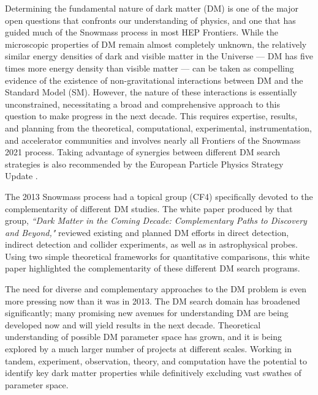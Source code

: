 \documentclass[nofootinbib]{article}
\begin{document}
Determining the fundamental nature of dark matter (DM) is one of the major open questions that confronts our understanding of physics, and one that has guided much of the Snowmass process in most HEP Frontiers. 
While the microscopic properties of DM remain almost completely unknown, the relatively similar energy densities of dark and visible matter in the Universe --- DM has five times more energy density than visible matter --- can be taken as compelling evidence of the existence of non-gravitational interactions between DM and the Standard Model (SM). However, the nature of these interactions is essentially unconstrained, necessitating a broad and comprehensive approach to this question to make progress in the next decade. 
This requires expertise, results, and planning from the theoretical, computational, experimental, instrumentation, and accelerator communities and involves nearly all Frontiers of the Snowmass 2021 process. Taking advantage of synergies between different DM search strategies is also recommended by the European Particle Physics Strategy Update \cite{Strategy:2019vxc,European:2720131}. 

The 2013 Snowmass process had a topical group (CF4) specifically devoted to the complementarity of different DM studies. 
The white paper produced by that group, \textit{``Dark Matter in the Coming Decade: Complementary Paths to Discovery and Beyond,"}\cite{Snowmass2013CosmicFrontierWorkingGroups1-4:2013wfj}
reviewed existing and planned DM efforts in direct detection, indirect detection and collider experiments, as well as in astrophysical probes. 
Using two simple theoretical frameworks for quantitative comparisons, this white paper highlighted the complementarity of these different DM search programs.  

The need for diverse and complementary approaches to the DM problem is even more pressing now than it was in 2013.
The DM search domain has broadened significantly; many promising new avenues for understanding DM are being developed now and will yield results in the next decade.
Theoretical understanding of possible DM parameter space has grown, and it is being explored by a much larger number of projects at different scales. Working in tandem, experiment, observation, theory, and computation have the potential to identify key dark matter properties while definitively excluding vast swathes of parameter space.
\end{document}
